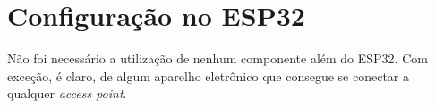 \section{Configuração no ESP32}

Não foi necessário a utilização de nenhum componente além do ESP32. Com exceção, é claro, de algum aparelho eletrônico que consegue se conectar a qualquer \textit{access point}.